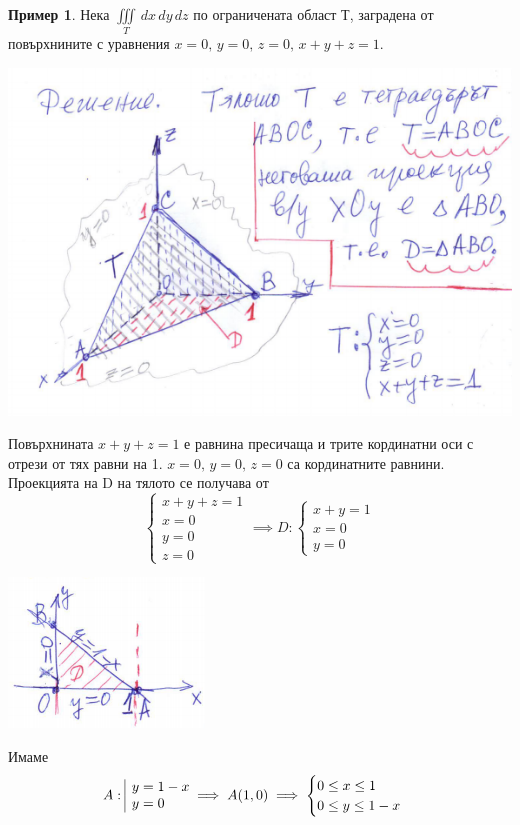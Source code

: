 \documentclass[a4paper,fleqn,12pt]{article}
\theoremstyle{definition}
\newtheorem{example}{Пример}[subsection]
\begin{document}
\newpage
\begin{example}
Нека $\iiint\limits_T \, dx \, dy \, dz$ по ограничената област Т, заградена от повърхнините с уравнения $x=0, \, y=0, \, z=0, \, x+y+z=1$.
\begin{center}
  \includegraphics[width = \linewidth]{Pics/calc/lec11-1-1.png}
\end{center}
Повърхнината $x+y+z = 1$ е равнина пресичаща и трите кординатни оси с отрези от тях равни на 1. $x=0, \, y=0, \, z=0$ са кординатните равнини. Проекцията на D на тялото се получава от 
$$\begin{cases} x+y+z = 1 \\ x=0 \\y=0 \\ z= 0 \end{cases} \implies D: \begin{cases} x+y= 1 \\ x=0 \\y=0 \end{cases}$$
\begin{center}
  \includegraphics{Pics/calc/lec11-1-2.png}
\end{center}
Имаме
$$A: \begin{array}{|l@{}} y = 1 - x \\ y=0 \end{array} \implies A(1,0) \implies \begin{cases} 0 \leq x \leq 1 \\ 0 \leq y \leq 1-x \end{cases}$$

\end{example}
\end{document}
